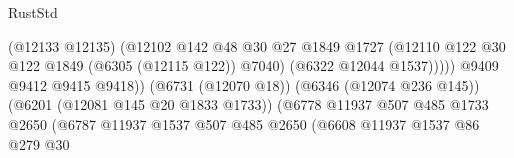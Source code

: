 \begin{lexlean}{RustStd}
\begin{coremodule}
                                                          (@12133 @12135)
                                                          (@12102
                                                            @142
                                                            @48
                                                            @30
                                                            @27
                                                            @1849
                                                            @1727
                                                            (@12110
                                                              @122
                                                              @30
                                                              @122
                                                              @1849
                                                              (@6305 (@12115 @122))
                                                              @7040)
                                                            (@6322 @12044 @1537)))))
                                                    @9409
                                                    @9412
                                                    @9415
                                                    @9418))
                                                (@6731 (@12070 @18))
                                                (@6346 (@12074 @236 @145))
                                                (@6201 (@12081 @145 @20 @1833 @1733))
                                                (@6778
                                                  @11937
                                                  @507
                                                  @485
                                                  @1733
                                                  @2650
                                                  (@6787
                                                    @11937
                                                    @1537
                                                    @507
                                                    @485
                                                    @2650
                                                    (@6608
                                                      @11937
                                                      @1537
                                                      @86
                                                      @279
                                                      @30

\end{coremodule}
\end{lexlean}
